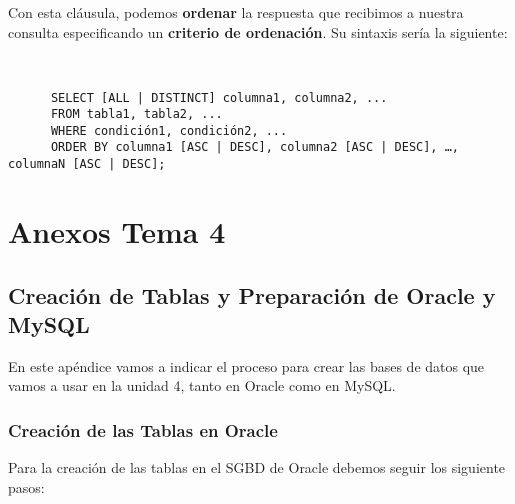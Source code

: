 Con esta cláusula, podemos \textbf{ordenar} la respuesta que recibimos a nuestra consulta especificando un \textbf{criterio de ordenación}. Su sintaxis sería la siguiente:

\begin{tcolorbox}[sharp corners, colback=yellow!30, colframe=white!20]
    \scriptsize
    \begin{verbatim}


      SELECT [ALL | DISTINCT] columna1, columna2, ...
      FROM tabla1, tabla2, ...
      WHERE condición1, condición2, ...
      ORDER BY columna1 [ASC | DESC], columna2 [ASC | DESC], …, columnaN [ASC | DESC];
    \end{verbatim}
\end{tcolorbox}


\appendix

\chapter{Anexos Tema 4}

\section{Creación de Tablas y Preparación de Oracle y MySQL}
En este apéndice vamos a indicar el proceso para crear las bases de datos que vamos a usar en la unidad 4, tanto en Oracle como en MySQL.

\subsection{Creación de las Tablas en Oracle}
Para la creación de las tablas en el SGBD de Oracle debemos seguir los siguiente pasos:

